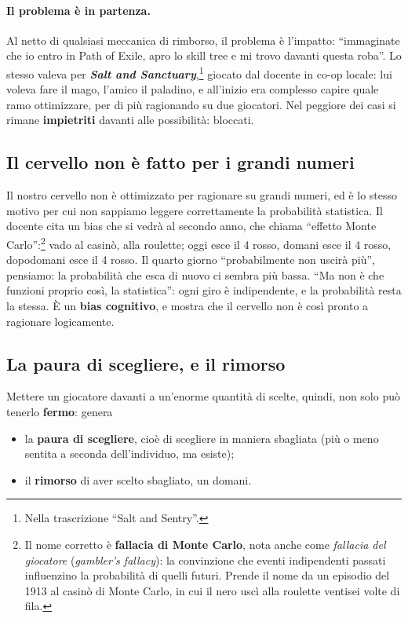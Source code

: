 \paragraph{Il problema è in partenza.} Al netto di qualsiasi meccanica di
rimborso, il problema è l'impatto: ``immaginate che io entro in Path of Exile,
apro lo skill tree e mi trovo davanti questa roba''. Lo stesso valeva per
\textbf{\emph{Salt and Sanctuary}},\footnote{Nella trascrizione ``Salt and
Sentry''.} giocato dal docente in co-op locale: lui voleva fare il mago,
l'amico il paladino, e all'inizio era complesso capire quale ramo
ottimizzare, per di più ragionando su due giocatori. Nel peggiore dei casi
si rimane \textbf{impietriti} davanti alle possibilità: bloccati.

\subsection{Il cervello non è fatto per i grandi numeri}

Il nostro cervello non è ottimizzato per ragionare su grandi numeri, ed è lo
stesso motivo per cui non sappiamo leggere correttamente la probabilità
statistica. Il docente cita un bias che si vedrà al secondo anno, che chiama
``effetto Monte Carlo'':\footnote{Il nome corretto è \textbf{fallacia di
Monte Carlo}, nota anche come \emph{fallacia del giocatore} (\emph{gambler's
fallacy}): la convinzione che eventi indipendenti passati influenzino la
probabilità di quelli futuri. Prende il nome da un episodio del 1913 al
casinò di Monte Carlo, in cui il nero uscì alla roulette ventisei volte di
fila.} vado al casinò, alla roulette; oggi esce il 4 rosso, domani esce il 4
rosso, dopodomani esce il 4 rosso. Il quarto giorno ``probabilmente non
uscirà più'', pensiamo: la probabilità che esca di nuovo ci sembra più bassa.
``Ma non è che funzioni proprio così, la statistica'': ogni giro è
indipendente, e la probabilità resta la stessa. È un \textbf{bias
cognitivo}, e mostra che il cervello non è così pronto a ragionare
logicamente.

\subsection{La paura di scegliere, e il rimorso}

Mettere un giocatore davanti a un'enorme quantità di scelte, quindi, non solo
può tenerlo \textbf{fermo}: genera
\begin{itemize}
  \item la \textbf{paura di scegliere}, cioè di scegliere in maniera
        sbagliata (più o meno sentita a seconda dell'individuo, ma esiste);
  \item il \textbf{rimorso} di aver scelto sbagliato, un domani.
\end{itemize}

